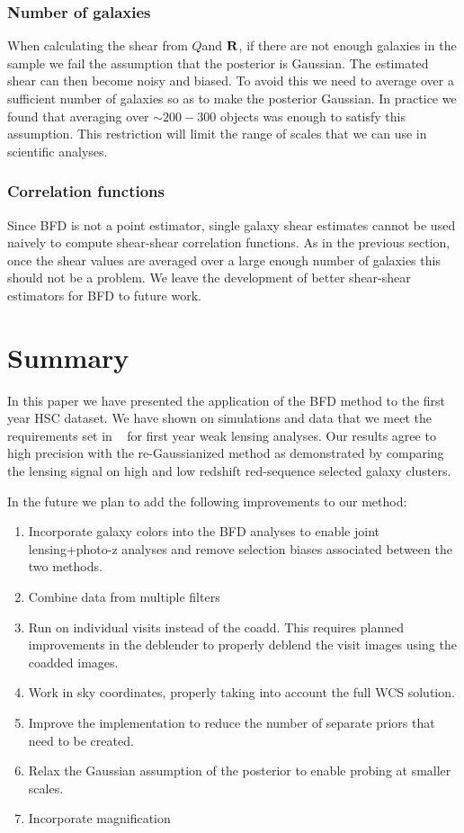 \documentclass[useAMS,usenatbib]{mnras}
\newcommand{\vecQ}{\mbox{\boldmath $Q$}}
\newcommand{\matR}{\mbox{$\bf R$}}
\begin{document}
\subsubsection{Number of galaxies}
\label{Sec:Number}
When calculating the shear from \vecQ and \matR, if there are not enough galaxies in the sample we fail the assumption that the posterior is Gaussian.  The estimated shear can then become noisy and biased.  To avoid this we need to average over a sufficient number of galaxies so as to make the posterior Gaussian.  In practice we found that averaging over $\sim200-300$ objects was enough to satisfy this assumption.  This restriction will limit the range of scales that we can use in scientific analyses.  

\subsubsection{Correlation functions}

Since BFD is not a point estimator, single galaxy shear estimates cannot be used naively to compute shear-shear correlation functions.  As in the previous section, once the shear values are averaged over a large enough number of galaxies this should not be a problem.  We leave the development of better shear-shear estimators for BFD to future work.

\section{Summary}
\label{Sec:Summary}

In this paper we have presented the application of the BFD method to the first year HSC dataset.  We have shown on simulations and data that we meet the requirements set in ~\citep{ShearPaper:inprep} for first year weak lensing analyses.  Our results agree to high precision with the re-Gaussianized method as demonstrated by comparing the lensing signal on high and low redshift red-sequence selected galaxy clusters.

In the future we plan to add the following improvements to our method:
\begin{enumerate}
\item Incorporate galaxy colors into the BFD analyses to enable joint lensing+photo-z analyses and remove selection biases associated between the two methods.
\item Combine data from multiple filters
\item Run on individual visits instead of the coadd.  This requires planned improvements in the deblender to properly deblend the visit images using the coadded images.
\item Work in sky coordinates, properly taking into account the full WCS solution.
\item Improve the implementation to reduce the number of separate priors that need to be created.
\item Relax the Gaussian assumption of the posterior to enable probing at smaller scales.
\item Incorporate magnification
\end{enumerate}
\end{document}
